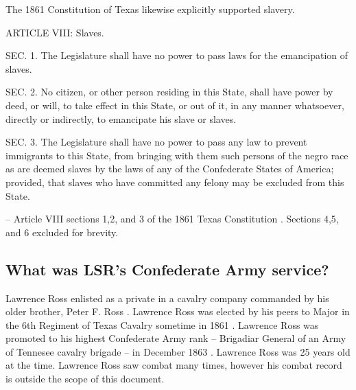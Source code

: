 \documentclass[12pt]{article}
\begin{document}
The 1861 Constitution of Texas likewise explicitly supported slavery.
\begin{displayquote}
ARTICLE VIII: Slaves.

SEC. 1. The Legislature shall have no power to pass laws for the emancipation of slaves.

SEC. 2. No citizen, or other person residing in this State, shall have power by deed, or will, to take effect in this State, or out of it, in any manner whatsoever, directly or indirectly, to emancipate his slave or slaves.

SEC. 3. The Legislature shall have no power to pass any law to prevent immigrants to this State, from bringing with them such persons of the negro race as are deemed slaves by the laws of any of the Confederate States of America; provided, that slaves who have committed any felony may be excluded from this State.

-- Article VIII sections 1,2, and 3 of the 1861 Texas Constitution \cite{tx:1861constitution}. Sections 4,5, and 6 excluded for brevity.
\end{displayquote}

\newpage
\subsection{What was LSR's Confederate Army service?}
Lawrence Ross enlisted as a private in a cavalry company commanded by his older brother, Peter F. Ross \cite{rosspapersummary}. Lawrence Ross was elected by his peers to Major in the 6th Regiment of Texas Cavalry sometime in 1861 \cite[pg. 36--37]{texasbrigade}. Lawrence Ross was promoted to his highest Confederate Army rank -- Brigadiar General of an Army of Tennesee cavalry brigade -- in December 1863 \cite{rosspapersummary}. Lawrence Ross was 25 years old at the time. Lawrence Ross saw combat many times, however his combat record is outside the scope of this document. 

\newpage
\end{document}
